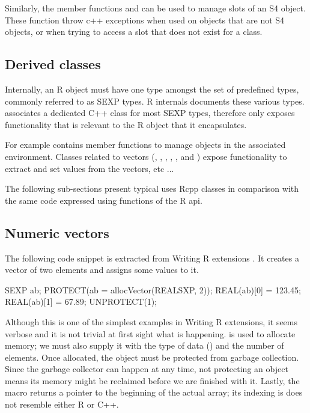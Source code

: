 Similarly, the member functions  and 
can be used to manage slots of an S4 object. These function throw 
c++ exceptions when used on objects that are not S4 objects, or when 
trying to access a slot that does not exist for a class.

\subsection{Derived classes}

Internally, an R object must have one type amongst the set of 
predefined types, commonly referred to as SEXP types. R internals
\citep{R:ints} documents these various types. 
 associates a dedicated C++ class for most SEXP types, 
therefore only exposes functionality that is relevant to the R object
that it encapsulates.

For example  contains 
member functions to manage objects in the associated environment. 
Classes related to vectors (, , 
, , , 
 and ) expose functionality
to extract and set values from the vectors, etc ...

The following sub-sections present typical uses Rcpp classes in
comparison with the same code expressed using functions of the R api.

\subsection{Numeric vectors}

The following code snippet is extracted from Writing R extensions
\citep{R:exts}. It creates a  vector of two elements 
and assigns some values to it. 

\begin{example}
SEXP ab;
PROTECT(ab = allocVector(REALSXP, 2));
REAL(ab)[0] = 123.45;
REAL(ab)[1] = 67.89;
UNPROTECT(1);
\end{example}

Although this is one of the simplest examples in Writing R extensions, 
it seems verbose and it is not trivial at first sight what is happening.
 is used to allocate memory; we must also supply it with
the type of data () and the number of elements.  Once
allocated, the  object must be protected from garbage
collection. Since the garbage collector can happen at any time, not
protecting an object means its memory might be reclaimed before we are
finished with it. Lastly, the  macro returns a pointer to the
beginning of the actual array; its indexing is does not resemble either R or
C++.

